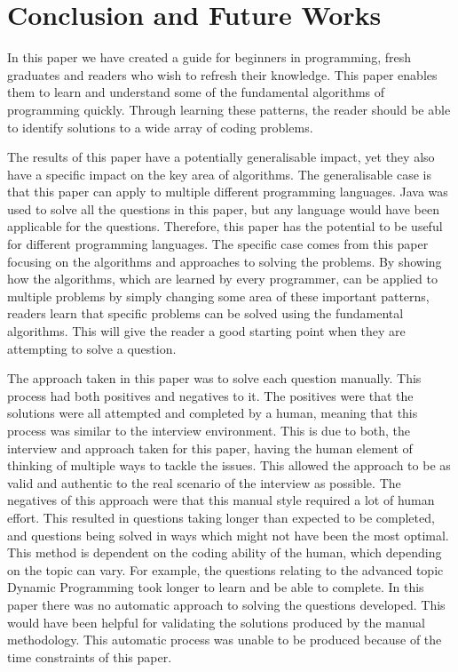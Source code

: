 \documentclass[10pt,twocolumn,hidelinks]{IEEEtran}
\begin{document}
\section{Conclusion and Future Works}
In this paper we have created a guide for beginners in programming, fresh graduates and readers who wish to refresh their knowledge. This paper enables them to learn and understand some of the fundamental algorithms of programming quickly. Through learning these patterns, the reader should be able to identify solutions to a wide array of coding problems. 
\par The results of this paper have a potentially generalisable impact, yet they also have a specific impact on the key area of algorithms. The generalisable case is that this paper can apply to multiple different programming languages. Java was used to solve all the questions in this paper, but any language would have been applicable for the questions. Therefore, this paper has the potential to be useful for different programming languages. The specific case comes from this paper focusing on the algorithms and approaches to solving the problems. By showing how the algorithms, which are learned by every programmer, can be applied to multiple problems by simply changing some area of these important patterns, readers learn that specific problems can be solved using the fundamental algorithms. This will give the reader a good starting point when they are attempting to solve a question.
\par The approach taken in this paper was to solve each question manually. This process had both positives and negatives to it. The positives were that the solutions were all attempted and completed by a human, meaning that this process was similar to the interview environment. This is due to both, the interview and approach taken for this paper, having the human element of thinking of multiple ways to tackle the issues. This allowed the approach to be as valid and authentic to the real scenario of the interview as possible.
The negatives of this approach were that this manual style required a lot of human effort. This resulted in questions taking longer than expected to be completed, and questions being solved in ways which might not have been the most optimal. This method is dependent on the coding ability of the human, which depending on the topic can vary. For example, the questions relating to the advanced topic Dynamic Programming took longer to learn and be able to complete.
 In this paper there was no automatic approach to solving the questions developed. This would have been helpful for validating the solutions produced by the manual methodology. This automatic process was unable to be produced because of the time constraints of this paper. 
\end{document}
